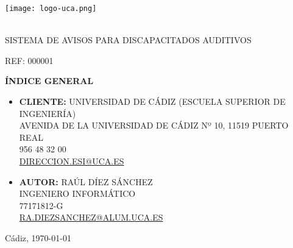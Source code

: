 \begin{center}

  \texttt{[image: logo-uca.png]} \\\

  \vspace{2.0cm}

  \huge{SISTEMA DE AVISOS PARA DISCAPACITADOS AUDITIVOS} \\
  
  \vspace{0.6cm}

  \large{REF: 000001} \\
  
  \vspace{1.0cm}

  \Huge{\textbf{ÍNDICE GENERAL}} \\

  \vspace{2.5cm}
  

\end{center}

\begin{itemize}
\item {\textbf{CLIENTE:} UNIVERSIDAD DE CÁDIZ (ESCUELA SUPERIOR DE INGENIERÍA)\\
            AVENIDA DE LA UNIVERSIDAD DE CÁDIZ Nº 10, 11519 PUERTO REAL\\
            956 48 32 00\\
            \underline{DIRECCION.ESI@UCA.ES}
            }
            \vspace{0.5cm}
\item {\textbf{AUTOR:} RAÚL DÍEZ SÁNCHEZ\\
            INGENIERO INFORMÁTICO\\
            77171812-G\\
            \underline{RA.DIEZSANCHEZ@ALUM.UCA.ES}}
\end{itemize}

\vspace{0.2cm}

\begin{flushright}
  \large{Cádiz, \today} \\
\end{flushright}
